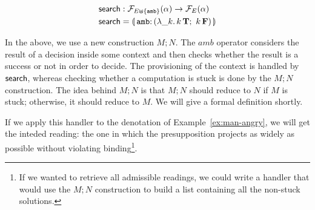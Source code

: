 \begin{align*}
  \search &: \FF_{E \uplus \{\op{amb}\}}(\alpha) \to \FF_E(\alpha) \\
  \search &= \banana{\onto{\op{amb}}{(\lam{\_ k}{\ap{k}{\true};\ \ap{k}{\false}})}}
\end{align*}

In the above, we use a new construction $M; N$. The $amb$ operator
considers the result of a decision inside some context and then checks
whether the result is a success or not in order to decide. The provisioning
of the context is handled by $\textsf{search}$, whereas checking whether a
computation is stuck is done by the $M; N$ construction. The idea behind
$M; N$ is that $M; N$ should reduce to $N$ if $M$ is stuck; otherwise, it
should reduce to $M$. We will give a formal definition shortly.

If we apply this handler to the denotation of Example~\ref{ex:man-angry},
we will get the inteded reading: the one in which the presupposition
projects as widely as possible without violating binding\footnote{If we
  wanted to retrieve all admissible readings, we could write a handler that
  would use the $M; N$ construction to build a list containing all the
  non-stuck solutions.}.

